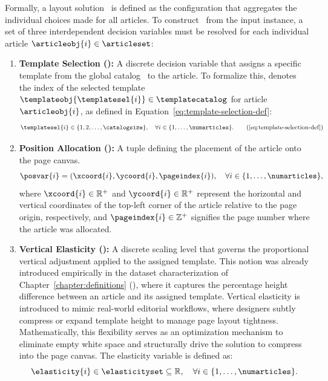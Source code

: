 Formally, a layout solution \solution\ is defined as the configuration that aggregates the individual choices made for all articles. To construct \solution\ from the input instance, a set of three interdependent decision variables must be resolved for each individual article $\articleobj{i} \in \articleset$:

\begin{enumerate}
    \item \textbf{Template Selection ():} A discrete decision variable that assigns a specific template from the global catalog \templatecatalog\ to the article. To formalize this,  denotes the index of the selected template $\templateobj{\templatesel{i}} \in \templatecatalog$ for article $\articleobj{i}$, as defined in Equation~\ref{eq:template-selection-def}:
    \begin{equation}
    \templatesel{i} \in \{1, 2, \dots, \catalogsize\}, \quad \forall i \in \{1, \dots, \numarticles\}.
    \tag{\ref{eq:template-selection-def}}
    \end{equation}

    \item \textbf{Position Allocation ():} A tuple defining the placement of the article onto the page canvas.
    \begin{equation}
    \posvar{i} = (\xcoord{i}, \ycoord{i}, \pageindex{i}), \quad \forall i \in \{1, \dots, \numarticles\},
    \end{equation}
    where $\xcoord{i} \in \mathbb{R}^+$ and $\ycoord{i} \in \mathbb{R}^+$ represent the horizontal and vertical coordinates of the top-left corner of the article relative to the page origin, respectively, and $\pageindex{i} \in \mathbb{Z}^+$ signifies the page number where the article was allocated.
    
    \item \textbf{Vertical Elasticity ():} A discrete scaling level that governs the proportional vertical adjustment applied to the assigned template.
    This notion was already introduced empirically in the dataset characterization of Chapter~\ref{chapter:definitions} (), where it captures the percentage height difference between an article and its assigned template.
    Vertical elasticity is introduced to mimic real-world editorial workflows, where designers subtly compress or expand template height to manage page layout tightness. Mathematically, this flexibility serves as an optimization mechanism to eliminate empty white space and structurally drive the solution to compress into the page canvas. The elasticity variable is defined as:
    \begin{equation}
    \elasticity{i} \in \elasticityset \subseteq \mathbb{R}, \quad \forall i \in \{1, \dots, \numarticles\}.
    \end{equation}


\end{enumerate}
